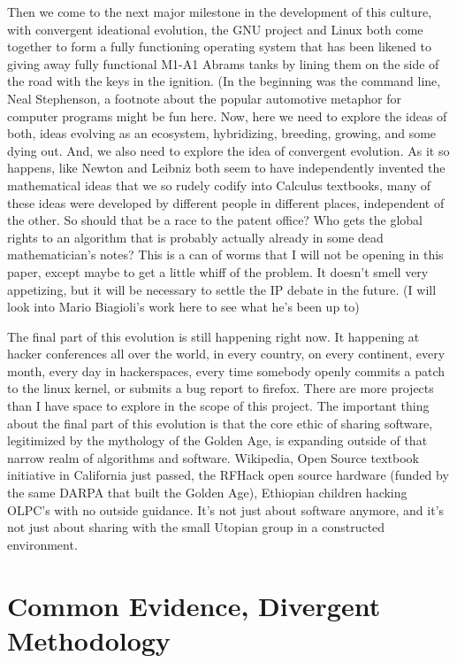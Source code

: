 \documentclass[11pt]{article}
\begin{document}
Then we come to the next major milestone in the development of this culture, with convergent ideational evolution, the GNU project and Linux both come together to form a fully functioning operating system that has been likened to giving away fully functional M1-A1 Abrams tanks by lining them on the side of the road with the keys in the ignition. (In the beginning was the command line, Neal Stephenson, a footnote about the popular automotive metaphor for computer programs might be fun here. Now, here we need to explore the ideas of both, ideas evolving as an ecosystem, hybridizing, breeding, growing, and some dying out. And, we also need to explore the idea of convergent evolution. As it so happens, like Newton and Leibniz both seem to have independently invented the mathematical ideas that we so rudely codify into Calculus textbooks, many of these ideas were developed by different people in different places, independent of the other. So should that be a race to the patent office? Who gets the global rights to an algorithm that is probably actually already in some dead mathematician’s notes? This is a can of worms that I will not be opening in this paper, except maybe to get a little whiff of the problem. It doesn’t smell very appetizing, but it will be necessary to settle the IP debate in the future. (I will look into Mario Biagioli’s work here to see what he’s been up to)

The final part of this evolution is still happening right now. It happening at hacker conferences all over the world, in every country, on every continent, every month, every day in hackerspaces, every time somebody openly commits a patch to the linux kernel, or submits a bug report to firefox. There are more projects than I have space to explore in the scope of this project. The important thing about the final part of this evolution is that the core ethic of sharing software, legitimized by the mythology of the Golden Age, is expanding outside of that narrow realm of algorithms and software. Wikipedia, Open Source textbook initiative in California just passed, the RFHack open source hardware (funded by the same DARPA that built the Golden Age), Ethiopian children hacking OLPC’s with no outside guidance. It’s not just about software anymore, and it’s not just about sharing with the small Utopian group in a constructed environment.



\section{Common Evidence,  Divergent Methodology}
\end{document}
